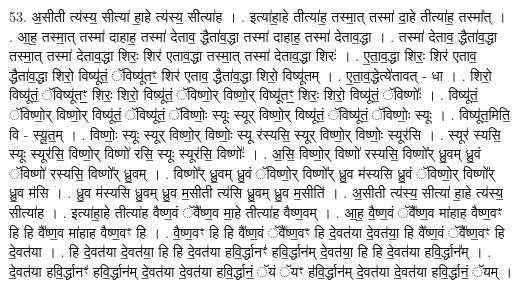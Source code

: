 \documentclass[17pt]{extarticle}
\begin{document}
53. अ॒सीती त्य॑स्य॒ सीत्या॑ हा॒हे त्य॑स्य॒ सीत्या॑ह । . इत्या॑हा॒हे तीत्या॑ह॒ तस्मा॒त् तस्मा॑ दा॒हे तीत्या॑ह॒ तस्मा᳚त् । . आ॒ह॒ तस्मा॒त् तस्मा॑ दाहाह॒ तस्मा॑ देताव॒ द्धैता॑व॒द्धा तस्मा॑ दाहाह॒ तस्मा॑ देताव॒द्धा । . तस्मा॑ देताव॒ द्धैता॑व॒द्धा तस्मा॒त् तस्मा॑ देताव॒द्धा शिरः॒ शिर॑ एताव॒द्धा तस्मा॒त् तस्मा॑ देताव॒द्धा शिरः॑ । . ए॒ता॒व॒द्धा शिरः॒ शिर॑ एताव॒ द्धैता॑व॒द्धा शिरो॒ विष्यू॑तं॒ ॅविष्यू॑तꣳ॒॒ शिर॑ एताव॒ द्धैता॑व॒द्धा शिरो॒ विष्यू॑तम् । . ए॒ता॒व॒द्धेत्ये॑तावत् - धा । . शिरो॒ विष्यू॑तं॒ ॅविष्यू॑तꣳ॒॒ शिरः॒ शिरो॒ विष्यू॑तं॒ ॅविष्णो॒र् विष्णो॒र् विष्यू॑तꣳ॒॒ शिरः॒ शिरो॒ विष्यू॑तं॒ ॅविष्णोः᳚ । . विष्यू॑तं॒ ॅविष्णो॒र् विष्णो॒र् विष्यू॑तं॒ ॅविष्यू॑तं॒ ॅविष्णोः॒ स्यूः स्यूर् विष्णो॒र् विष्यू॑तं॒ ॅविष्यू॑तं॒ ॅविष्णोः॒ स्यूः । . विष्यू॑त॒मिति॒ वि - स्यू॒त॒म् । . विष्णोः॒ स्यूः स्यूर् विष्णो॒र् विष्णोः॒ स्यू र॑स्यसि॒ स्यूर् विष्णो॒र् विष्णोः॒ स्यूर॑सि । . स्यूर॑ स्यसि॒ स्यूः स्यूर॑सि॒ विष्णो॒र् विष्णो॑ रसि॒ स्यूः स्यूर॑सि॒ विष्णोः᳚ । . अ॒सि॒ विष्णो॒र् विष्णो॑ रस्यसि॒ विष्णो᳚र् ध्रु॒वम् ध्रु॒वं ॅविष्णो॑ रस्यसि॒ विष्णो᳚र् ध्रु॒वम् । . विष्णो᳚र् ध्रु॒वम् ध्रु॒वं ॅविष्णो॒र् विष्णो᳚र् ध्रु॒व म॑स्यसि ध्रु॒वं ॅविष्णो॒र् विष्णो᳚र् ध्रु॒व म॑सि । . ध्रु॒व म॑स्यसि ध्रु॒वम् ध्रु॒व म॒सीती त्य॑सि ध्रु॒वम् ध्रु॒व म॒सीति॑ । . अ॒सीती त्य॑स्य॒ सीत्या॑ हा॒हे त्य॑स्य॒ सीत्या॑ह । . इत्या॑हा॒हे तीत्या॑ह वैष्ण॒वं ॅवै᳚ष्ण॒व मा॒हे तीत्या॑ह वैष्ण॒वम् । . आ॒ह॒ वै॒ष्ण॒वं ॅवै᳚ष्ण॒व मा॑हाह वैष्ण॒वꣳ हि हि वै᳚ष्ण॒व मा॑हाह वैष्ण॒वꣳ हि । . वै॒ष्ण॒वꣳ हि हि वै᳚ष्ण॒वं ॅवै᳚ष्ण॒वꣳ हि दे॒वत॑या दे॒वत॑या॒ हि वै᳚ष्ण॒वं ॅवै᳚ष्ण॒वꣳ हि दे॒वत॑या । . हि दे॒वत॑या दे॒वत॑या॒ हि हि दे॒वत॑या हवि॒र्द्धानꣳ॑ हवि॒र्द्धान॑म् दे॒वत॑या॒ हि हि दे॒वत॑या हवि॒र्द्धान᳚म् । . दे॒वत॑या हवि॒र्द्धानꣳ॑ हवि॒र्द्धान॑म् दे॒वत॑या दे॒वत॑या हवि॒र्द्धानं॒ ॅयं ॅयꣳ ह॑वि॒र्द्धान॑म् दे॒वत॑या दे॒वत॑या हवि॒र्द्धानं॒ ॅयम् । \newline
\end{document}
